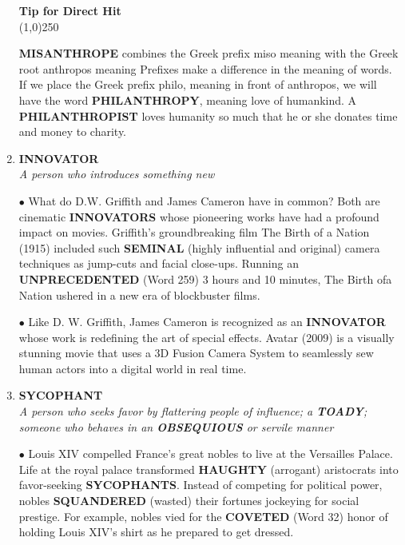 \documentclass{book}
\begin{document}
\begin{enumerate}
 \begin{tcolorbox}
\begin{center}
\textbf{Tip for Direct Hit}\\
\line(1,0){250}\\
\end{center}
\textbf{MISANTHROPE} combines the Greek prefix
miso meaning  with the Greek root anthropos meaning  Prefixes make a difference in the meaning of words. If we place
the Greek prefix philo, meaning  in front of anthropos, we will have the word \textbf{PHILANTHROPY}, meaning love of humankind. A \textbf{PHILANTHROPIST} loves humanity so much that he or she donates time and money to charity.
\end{tcolorbox}


\item \textbf{INNOVATOR}\\
\textit{A person who introduces something new}

$ \bullet $ What do D.W. Griffith and James Cameron have in
common? Both are cinematic \textbf{INNOVATORS} whose
pioneering works have had a profound impact on
movies. Griffith's groundbreaking film The Birth of a
Nation (1915) included such \textbf{SEMINAL} (highly
influential and original) camera techniques as jump-cuts and facial close-ups. Running an
\textbf{UNPRECEDENTED} (Word 259) 3 hours and 10
minutes, The Birth ofa Nation ushered in a new era
of blockbuster films.

$ \bullet $ Like D. W. Griffith, James Cameron is recognized as
an \textbf{INNOVATOR} whose work is redefining the art of
special effects. Avatar (2009) is a visually stunning
movie that uses a 3D Fusion Camera System to
seamlessly sew human actors into a digital world in
real time.

\item \textbf{SYCOPHANT}\\
\textit{A person who seeks favor by flattering people
of influence; a \textbf{TOADY}; someone who behaves
in an \textbf{OBSEQUIOUS} or servile manner}

$ \bullet $ Louis XIV compelled France's great nobles to live at
the Versailles Palace. Life at the royal palace
transformed \textbf{HAUGHTY} (arrogant) aristocrats into
favor-seeking \textbf{SYCOPHANTS}. Instead of competing
for political power, nobles \textbf{SQUANDERED} (wasted)
their fortunes jockeying for social prestige. For
example, nobles vied for the \textbf{COVETED} (Word 32)
honor of holding Louis XIV's shirt as he prepared to
get dressed.


\end{enumerate}
\end{document}
